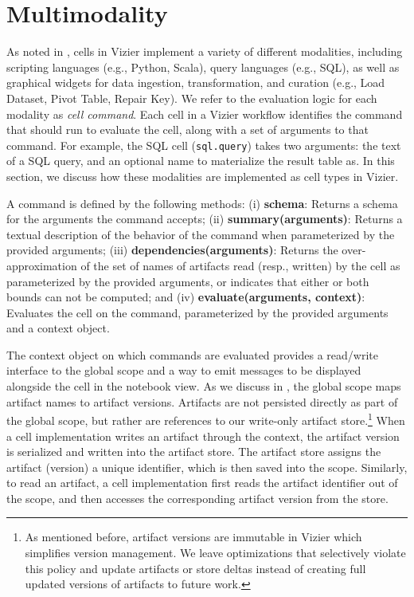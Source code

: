 
\section{Multimodality}
\label{sec:multimodality}

As noted in , cells in Vizier implement a variety of different modalities, including scripting languages (e.g., Python, Scala), query languages (e.g., SQL), as well as graphical widgets for data ingestion, transformation, and curation (e.g., Load Dataset, Pivot Table, Repair Key).
We refer to the evaluation logic for each modality as \emph{cell command}.
Each cell in a Vizier workflow identifies the command that should run to evaluate the cell, along with a set of arguments to that command.
For example, the SQL cell (\texttt{sql.query}) takes two arguments: the text of a SQL query, and an optional name to materialize the result table as. In this section, we discuss how these modalities are implemented as cell types in Vizier. %

A command is defined by the following methods:
(i) \textbf{schema}: Returns a schema for the arguments the command accepts;
(ii) \textbf{summary(arguments)}: Returns a textual description of the behavior of the command when parameterized by the provided arguments;
(iii) \textbf{dependencies(arguments)}: Returns the over-approximation of the set of names of artifacts read (resp., written) by the cell as parameterized by the provided arguments, or indicates that either or both bounds can not be computed; and
(iv) \textbf{evaluate(arguments, context)}: Evaluates the cell on the command, parameterized by the provided arguments and a context object.

The context object on which commands are evaluated provides a read/write interface to the global scope and a way to emit messages to be displayed alongside the cell in the notebook view.
As we discuss in , the global scope maps artifact names to artifact versions.
Artifacts are not persisted directly as part of the global scope, but rather are references to our write-only artifact store.\footnote{As mentioned before, artifact versions are immutable in Vizier which simplifies version management. We leave optimizations that selectively violate this policy and update artifacts or store deltas instead of creating full updated versions of artifacts to future work.}
When a cell implementation writes an artifact through the context, the artifact version is serialized and written into the artifact store.
The artifact store assigns the artifact (version) a unique identifier, which is then saved into the scope.
Similarly, to read an artifact, a cell implementation first reads the artifact identifier out of the scope, and then accesses the corresponding artifact version from the store.


